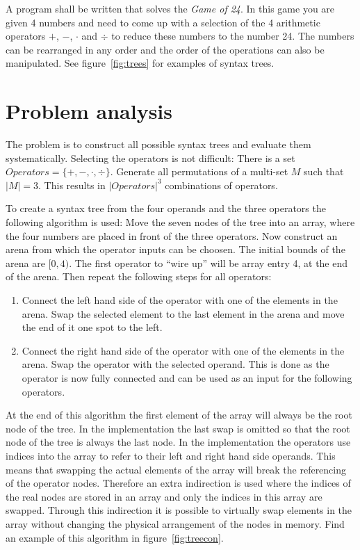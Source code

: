 \documentclass[11pt,a4paper]{article}
\begin{document}
A program shall be written that solves the \textit{Game of 24}.
In this game you are given 4 numbers and need to come up with a
selection of the 4 arithmetic operators $+$, $-$, $\cdot$ and $\div$ to
reduce these numbers to the number 24.
The numbers can be rearranged in any order and the order of the
operations can also be manipulated.
See figure~\ref{fig:trees} for examples of syntax trees.




\section{Problem analysis}
\label{sec:analysis}

The problem is to construct all possible syntax trees and evaluate
them systematically.
Selecting the operators is not difficult:
There is a set $Operators = \{+, -, \cdot, \div\}$. Generate all
permutations of a multi-set $M$ such that $\vert M \vert = 3$.
\newcommand{\complexop}{{\vert Operators \vert}^3}
\newcommand{\opconnect}{4 \cdot 3 \cdot 3 \cdot 2 \cdot 2 \cdot 1}
This results in $\complexop$ combinations of
operators.

To create a syntax tree from the four operands and the three operators
the following algorithm is used:
Move the seven nodes of the tree into an array, where the four
numbers are placed in front of the three operators.
Now construct an arena from which the operator inputs can be
choosen. The initial bounds of the arena are $[0, 4)$.
The first operator to ``wire up'' will be array entry 4, at the end
of the arena.
Then repeat the following steps for all operators:
\begin{enumerate}
  \item Connect the left hand side of the operator with one of the
    elements in the arena. Swap the selected element to the last
    element in the arena and move the end of it one spot to the left.
  \item Connect the right hand side of the operator with one of the
    elements in the arena. Swap the operator with the selected
    operand. This is done as the operator is now fully connected and
    can be used as an input for the following operators.
\end{enumerate}
At the end of this algorithm the first
element of the array will always be the root node of the tree. In the
implementation the last swap is omitted so that the root node of the
tree is always the last node.
In the implementation the operators use indices into the array to
refer to their left and right hand side operands. This means that
swapping the actual elements of the array will break the referencing
of the operator nodes.
Therefore an extra indirection is used where the indices of the real
nodes are stored in an array and only the indices in this
array are swapped.
Through this indirection it is possible to virtually swap elements in
the array without changing the physical arrangement of the nodes in
memory.
Find an example of this algorithm in figure~\ref{fig:treecon}.
\end{document}
